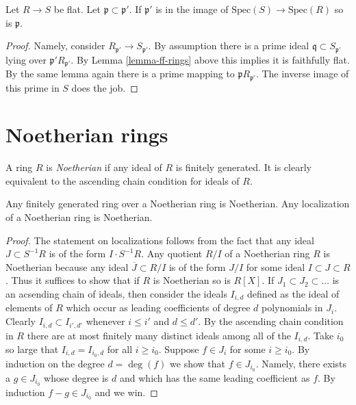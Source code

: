 \begin{lemma}
\label{lemma-flat-gd}
Let $R\to S$ be flat. Let $\mathfrak p \subset \mathfrak p'$.
If $\mathfrak p'$ is in the image of $\text{Spec}(S)
\to \text{Spec}(R)$ so is $\mathfrak p$.
\end{lemma}

\begin{proof}
Namely, consider $R_{\mathfrak p'} \to S_{\mathfrak p'}$.
By assumption there is a prime ideal $\mathfrak q  \subset  S_{\mathfrak p'}$
lying over $\mathfrak p' R_{\mathfrak p'}$.
By Lemma \ref{lemma-ff-rings} above this implies it is faithfully
flat. By the same lemma again there is a prime mapping to
$\mathfrak p R_{\mathfrak p'}$. The inverse image of this
prime in $S$ does the job.
\end{proof}


\section{Noetherian rings}
\label{section-Noetherian}

\noindent
A ring $R$ is {\it Noetherian} if any ideal of $R$ is
finitely generated. It is clearly equivalent to the
ascending chain condition for ideals of $R$.

\begin{lemma}
\label{lemma-Noetherian-permanence}
Any finitely generated ring over a Noetherian ring
is Noetherian. Any localization of a Noetherian ring
is Noetherian.
\end{lemma}

\begin{proof}
The statement on localizations follows from the fact
that any ideal $J \subset S^{-1}R$ is of the form
$I \cdot S^{-1}R$. Any quotient $R/I$ of a Noetherian
ring $R$ is Noetherian because any ideal $\overline{J} \subset R/I$
is of the form $J/I$ for some ideal $I \subset J \subset R$.
Thus it suffices to show that if $R$ is Noetherian so
is $R[X]$. If $J_1 \subset J_2 \subset \ldots$ is an
acsending chain of ideals, then consider the ideals $I_{i,d}$
defined as the ideal of elements of $R$ which occur as leading
coefficients of degree $d$ polynomials in $J_i$.
Clearly $I_{i, d} \subset I_{i', d'}$ whenever
$i \leq i'$ and $d \leq d'$. By the ascending chain condition
in $R$ there are at most finitely many distinct ideals among all of
the $I_{i,d}$. Take $i_0$ so large that $I_{i, d} = I_{i_0, d}$
for all $i \geq i_0$. Suppose $f \in J_i$ for some $i \geq i_0$.
By induction on the degree $d = \deg(f)$ we show that $f \in J_{i_0}$.
Namely, there exists a $g\in J_{i_0}$ whose degree is $d$ and which
has the same leading coefficient as $f$. By induction
$f - g \in J_{i_0}$ and we win.
\end{proof}

